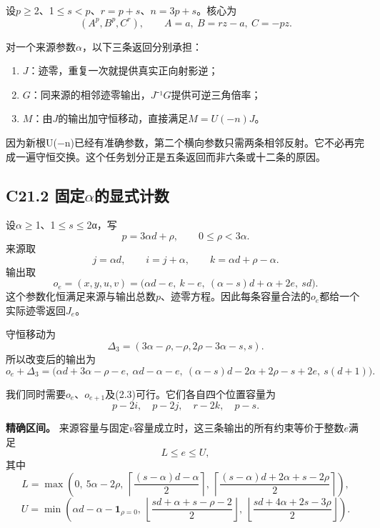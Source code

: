 \documentclass[11pt,a4paper]{article}
\newcommand{\tightlist}{\setlength{\itemsep}{0pt}\setlength{\parskip}{0pt}}
\theoremstyle{definition}
\numberwithin{equation}{section}
\begin{document}
{设\ensuremath{p}\ensuremath{\ge}2、1\ensuremath{\le}\ensuremath{s<p}、\ensuremath{r=p+s}、\ensuremath{n=3p+s}。核心为} \[
(A^p,B^p,C^r),\qquad A=a,\ B=rz-a,\ C=-pz.
\]

{对一个来源参数\ensuremath{\alpha }，以下三条返回分别承担：}

\begin{enumerate}
\def\labelenumi{\arabic{enumi}.}
\tightlist
\item
  {\ensuremath{J}：迹零，重复一次就提供真实正向射影逆；}
\item
  {\ensuremath{G}：同来源的相邻迹零输出，\ensuremath{J}⁻¹\ensuremath{G}提供可逆三角倍率；}
\item
  {\ensuremath{M}：由\ensuremath{J}的输出加守恒移动，直接满足\ensuremath{M=U(-n)J}。}
\end{enumerate}

{因为新根U(−n)已经有准确参数，第二个横向参数只需两条相邻反射。它不必再完成一遍守恒交换。这个任务划分正是五条返回而非六条或十二条的原因。}

\subsection*{\texorpdfstring{{C21.2} {固定\ensuremath{\alpha }的显式计数}}{C21.2 固定的显式计数}}\label{C21-h141}

{设\ensuremath{\alpha }\ensuremath{\ge}1、1\ensuremath{\le}\ensuremath{s}\ensuremath{\le}2α，写} \[
p=3\alpha d+\rho,\qquad 0\le\rho<3\alpha.
\] {来源取} \[
j=\alpha d,\qquad i=j+\alpha,\qquad
k=\alpha d+\rho-\alpha.
\tag{C21.2.1}
\] {输出取} \[
o_e=(x,y,u,v)=
\bigl(\alpha d-e,\ k-e,\ (\alpha-s)d+\alpha+2e,\ sd\bigr).
\tag{C21.2.2}
\] {这个参数化恒满足来源与输出总数\ensuremath{p}、迹零方程。因此每条容量合法的\ensuremath{o_{e}}都给一个实际迹零返回\ensuremath{J_{e}}。}

{守恒移动为} \[
\Delta_3=(3\alpha-\rho,-\rho,2\rho-3\alpha-s,s).
\] {所以改变后的输出为} \[
o_e+\Delta_3=
\bigl(\alpha d+3\alpha-\rho-e,\ \alpha d-\alpha-e,\
(\alpha-s)d-2\alpha+2\rho-s+2e,\ s(d+1)\bigr).
\tag{C21.2.3}
\]

{我们同时需要\ensuremath{o_{e}}、\ensuremath{o_{e+1}}及(2.3)可行。它们各自四个位置容量为} \[
p-2i,\quad p-2j,\quad r-2k,\quad p-s.
\tag{C21.2.4}
\]

\textbf{{精确区间。}} {来源容量与固定\ensuremath{v}容量成立时，这三条输出的所有约束等价于整数\ensuremath{e}满足} \[
L\le e\le U,
\] {其中} \[
\boxed{
L=\max\left(
0,\ 5\alpha-2\rho,\
\left\lceil\frac{(s-\alpha)d-\alpha}{2}\right\rceil,\
\left\lceil\frac{(s-\alpha)d+2\alpha+s-2\rho}{2}\right\rceil
\right),
}
\tag{C21.2.5}
\] \[
\boxed{
U=\min\left(
\alpha d-\alpha-\mathbf1_{\rho=0},\
\left\lfloor\frac{sd+\alpha+s-\rho-2}{2}\right\rfloor,\
\left\lfloor\frac{sd+4\alpha+2s-3\rho}{2}\right\rfloor
\right).
}
\tag{C21.2.6}
\]
\end{document}
